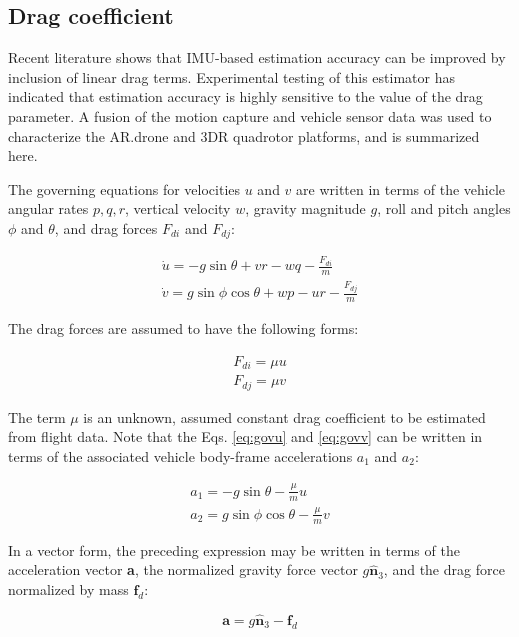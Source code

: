 \documentclass{article}
\newcommand{\B}[1]{\textbf{#1}} %
\newcommand{\U}[1]{\hat{\textbf{#1}}} %
\begin{document}
\subsection{Drag coefficient}
\label{sec:drag}

Recent literature shows that IMU-based estimation accuracy can be improved by inclusion of linear drag terms\cite{macdonald2014}. Experimental testing of this estimator has indicated that estimation accuracy is highly sensitive to the value of the drag parameter. A fusion of the motion capture and vehicle sensor data was used to characterize the AR.drone and 3DR quadrotor platforms, and is summarized here.

The governing equations for velocities $u$ and $v$ are written in terms of the vehicle angular rates $p,q,r$, vertical velocity $w$, gravity magnitude $g$, roll and pitch angles $\phi$ and $\theta$, and drag forces $F_{di}$ and $F_{dj}$:

\begin{align}
\dot{u} = -g\sin{\theta} + vr-wq - \frac{F_{di}}{m} \label{eq:govu} \\
\dot{v} = g\sin{\phi}\cos{\theta} + wp-ur - \frac{F_{dj}}{m} \label{eq:govv}
\end{align}

The drag forces are assumed to have the following forms:

\begin{align}
F_{di} = \mu u\\
F_{dj} = \mu v
\end{align}

The term $\mu$ is an unknown, assumed constant drag coefficient to be estimated from flight data. Note that the Eqs. \ref{eq:govu} and \ref{eq:govv} can be written in terms of the associated vehicle body-frame accelerations $a_1$ and $a_2$:

\begin{align}
a_1 = -g\sin{\theta} - \frac{\mu}{m}u\\
a_2 = g\sin{\phi}\cos{\theta} - \frac{\mu}{m}v
\end{align}

In a vector form, the preceding expression may be written in terms of the acceleration vector \B{a}, the normalized gravity force vector $g\U{n}_3$, and the drag force normalized by mass $\B{f}_d$:

\begin{equation}
\B{a} = g\U{n}_3 - \B{f}_d
\end{equation}
\end{document}

